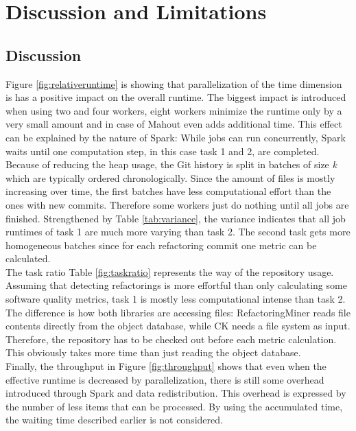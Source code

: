
\section{Discussion and Limitations}
\label{sec:discussion}

\subsection{Discussion}
\label{sec:observations}
Figure \ref{fig:relativeruntime} is showing that parallelization of the time dimension is has a positive impact on the overall runtime. The biggest impact is introduced when using two and four workers, eight workers minimize the runtime only by a very small amount and in case of Mahout even adds additional time. This effect can be explained by the nature of Spark: While jobs can run concurrently, Spark waits until one computation step, in this case task 1 and 2, are completed. Because of reducing the heap usage, the Git history is split in batches of size \emph{k} which are typically ordered chronologically. Since the amount of files is mostly increasing over time, the first batches have less computational effort than the ones with new commits. Therefore some workers just do nothing until all jobs are finished. Strengthened by Table \ref{tab:variance}, the variance indicates that all job runtimes of task 1 are much more varying than task 2. The second task gets more homogeneous batches since for each refactoring commit one metric can be calculated.\\
The task ratio Table \ref{fig:taskratio} represents the way of the repository usage. Assuming that detecting refactorings is more effortful than only calculating some software quality metrics, task 1 is mostly less computational intense than task 2. The difference is how both libraries are accessing files: RefactoringMiner reads file contents directly from the object database, while CK needs a file system as input. Therefore, the repository has to be checked out before each metric calculation. This obviously takes more time than just reading the object database.\\
Finally, the throughput in Figure \ref{fig:throughput} shows that even when the effective runtime is decreased by parallelization, there is still some overhead introduced through Spark and data redistribution. This overhead is expressed by the number of less items that can be processed. By using the accumulated time, the waiting time described earlier is not considered.

